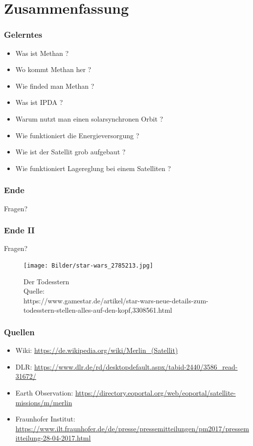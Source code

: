 \documentclass{beamer}
\begin{document}
\section{Zusammenfassung}
\begin{frame}
  \frametitle{Gelerntes}
  \begin{itemize}
    \item Was ist Methan ?
    \item Wo kommt Methan her ?
    \item Wie finded man Methan ?
    \item Was ist IPDA ?
    \item Warum nutzt man einen solarsynchronen Orbit ?
    \item Wie funktioniert die Energieversorgung ?
    \item Wie ist der Satellit grob aufgebaut ?
    \item Wie funktioniert Lagereglung bei einem Satelliten ?
  \end{itemize}
\end{frame}

\begin{frame}
  \frametitle{Ende}
  \begin{center}
    \large{Fragen?}
  \end{center}
\end{frame}

\begin{frame}
  \frametitle{Ende II}
  \begin{center}
    \large{Fragen?}
  \end{center} 
  \begin{figure}[t]
    \centering
    \texttt{[image: Bilder/star-wars\_2785213.jpg]}
    \caption{Der Todesstern\\ 
    Quelle:\\ https://www.gamestar.de/artikel/star-wars-neue-details-zum-todesstern-stellen-alles-auf-den-kopf,3308561.html}
  \end{figure}
\end{frame}

\begin{frame}
  \frametitle{Quellen}
  \begin{itemize}
    \item Wiki: \url{https://de.wikipedia.org/wiki/Merlin_(Satellit)}
    \item DLR: \url{https://www.dlr.de/rd/desktopdefault.aspx/tabid-2440/3586_read-31672/}
    \item Earth Observation: \url{https://directory.eoportal.org/web/eoportal/satellite-missions/m/merlin}
    \item Fraunhofer Institut: \url{https://www.ilt.fraunhofer.de/de/presse/pressemitteilungen/pm2017/pressemitteilung-28-04-2017.html}
  \end{itemize}
\end{frame}
\end{document}
